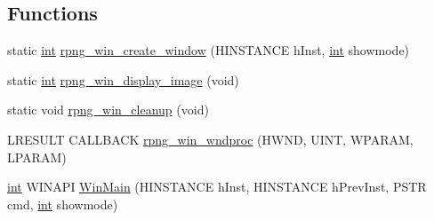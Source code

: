 \subsection*{Functions}
\begin{DoxyCompactItemize}
\item 
static \mbox{\hyperlink{ioapi_8h_a787fa3cf048117ba7123753c1e74fcd6}{int}} \mbox{\hyperlink{rpng-win_8c_af3efd367c6a70336925006199ab430e6}{rpng\+\_\+win\+\_\+create\+\_\+window}} (H\+I\+N\+S\+T\+A\+N\+CE h\+Inst, \mbox{\hyperlink{ioapi_8h_a787fa3cf048117ba7123753c1e74fcd6}{int}} showmode)
\item 
static \mbox{\hyperlink{ioapi_8h_a787fa3cf048117ba7123753c1e74fcd6}{int}} \mbox{\hyperlink{rpng-win_8c_aaa8b69a6c5c9c2d35b7d67787a55e218}{rpng\+\_\+win\+\_\+display\+\_\+image}} (void)
\item 
static void \mbox{\hyperlink{rpng-win_8c_ae6425ba78c4398b8d03f6c9eeeecbb64}{rpng\+\_\+win\+\_\+cleanup}} (void)
\item 
L\+R\+E\+S\+U\+LT C\+A\+L\+L\+B\+A\+CK \mbox{\hyperlink{rpng-win_8c_a1b1b264a2d9a35661c12289f38929843}{rpng\+\_\+win\+\_\+wndproc}} (H\+W\+ND, U\+I\+NT, W\+P\+A\+R\+AM, L\+P\+A\+R\+AM)
\item 
\mbox{\hyperlink{ioapi_8h_a787fa3cf048117ba7123753c1e74fcd6}{int}} W\+I\+N\+A\+PI \mbox{\hyperlink{rpng-win_8c_a2db31d959abfda840605268cd8ba1d08}{Win\+Main}} (H\+I\+N\+S\+T\+A\+N\+CE h\+Inst, H\+I\+N\+S\+T\+A\+N\+CE h\+Prev\+Inst, P\+S\+TR cmd, \mbox{\hyperlink{ioapi_8h_a787fa3cf048117ba7123753c1e74fcd6}{int}} showmode)
\end{DoxyCompactItemize}

